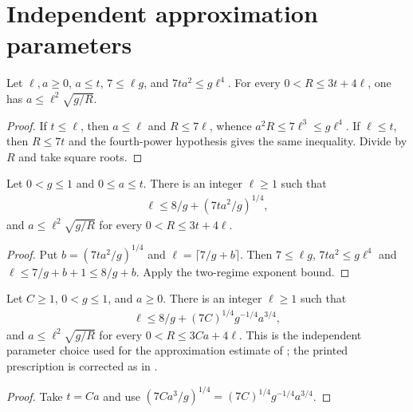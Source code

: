 \section{Independent approximation parameters}

\begin{lemma}
    \label{thm:independent_truncation_filter_exponent}
    \leanok
    Let $\ell,a\ge0$, $a\le t$, $7\le\ell g$, and
    $7ta^2\le g\ell^4$. For every $0<R\le3t+4\ell$,
    one has $a\le\ell^2\sqrt{g/R}$.
\end{lemma}
\begin{proof}
    \leanok
    If $t\le\ell$, then $a\le\ell$ and $R\le7\ell$, whence
    $a^2R\le7\ell^3\le g\ell^4$.
    If $\ell\le t$, then $R\le7t$ and the fourth-power hypothesis gives
    the same inequality. Divide by $R$ and take square roots.
\end{proof}

\begin{lemma}
    \label{thm:independent_truncation_filter_scale}
    \leanok
    Let $0<g\le1$ and $0\le a\le t$.
    There is an integer $\ell\ge1$ such that
    \begin{align}
        \ell\le8/g+(7ta^2/g)^{1/4},
        \label{eq:independent_truncation_integer_scale}
    \end{align}
    and $a\le\ell^2\sqrt{g/R}$ for every $0<R\le3t+4\ell$.
\end{lemma}
\begin{proof}
    \leanok
    Put $b=(7ta^2/g)^{1/4}$ and $\ell=\lceil7/g+b\rceil$.
    Then $7\le\ell g$, $7ta^2\le g\ell^4$ and
    $\ell\le7/g+b+1\le8/g+b$.
    Apply the two-regime exponent bound.
\end{proof}

\begin{lemma}
    \label{thm:quarter_power_truncation_filter_scale}
    \leanok
    Let $C\ge1$, $0<g\le1$, and $a\ge0$.
    There is an integer $\ell\ge1$ such that
    \begin{align}
        \ell\le8/g+(7C)^{1/4}g^{-1/4}a^{3/4},
        \label{eq:independent_truncation_quarter_scale}
    \end{align}
    and $a\le\ell^2\sqrt{g/R}$ for every $0<R\le3Ca+4\ell$.
    This is the independent parameter choice used for the approximation
    estimate of \cite[Theorem~4.9]{Arad2016RigorousRG}; the printed
    prescription is corrected as in
    \cite{gap:alvv16_approximation_parameters}.
\end{lemma}
\begin{proof}
    \leanok
    Take $t=Ca$ and use
    $(7Ca^3/g)^{1/4}=(7C)^{1/4}g^{-1/4}a^{3/4}$.
\end{proof}

